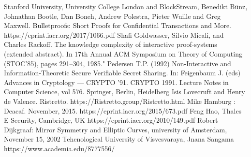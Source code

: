 \documentclass{article}
\begin{document}
\newpage



\begin{thebibliography}{99}

 Stanford University, University College London and BlockStream, Benedikt Bünz, Johnathan Bootle, Dan Boneh, Andrew Polestra, Pieter Wuille and Greg Maxwell. Bulletproofs: Short Proofs for Confidential Transactions and More.\\ https://eprint.iacr.org/2017/1066.pdf
 Shafi Goldwasser, Silvio Micali, and Charles Rackoff. The knowledge complexity of interactive
proof-systems (extended abstract). In 17th Annual ACM Symposium on Theory of Computing
(STOC’85), pages 291–304, 1985."
 Pedersen T.P. (1992) Non-Interactive and Information-Theoretic Secure Verifiable Secret Sharing. In: Feigenbaum J. (eds) Advances in Cryptology — CRYPTO ’91. CRYPTO 1991. Lecture Notes in Computer Science, vol 576. Springer, Berlin, Heidelberg
 Isis Lovecruft and Henry de Valence. Ristretto. https://Ristretto.group/Ristretto.html
 Mike Hamburg : Deacaf. November, 2015. https://eprint.iacr.org/2015/673.pdf
 Feng Hao, Thales E-Security, Cambridge, UK https://eprint.iacr.org/2010/149.pdf
Robert Dijkgraaf: Mirror Symmetry and Elliptic Curves, university of Amsterdam, November 15, 2002
 Tehcnological University of Visvesvaraya, Jnana Sangama https://www.academia.edu/8777556/

\end{thebibliography}
\end{document}
